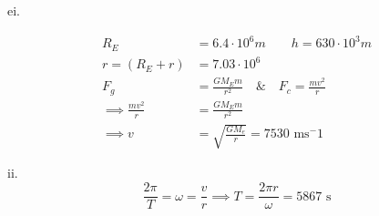 \documentclass[12pt]{article}
\begin{document}
    ei.

    \begin{equation*}
        \begin{split}
            R_E&=6.4\cdot10^6m\qquad h=630\cdot10^3m\\
            r=(R_E+r)&=7.03\cdot10^6\\
            F_g&=\frac{GM_Em}{r^2}\quad\&\quad F_c=\frac{mv^2}{r}\\
            \implies\frac{mv^2}{r}&=\frac{GM_Em}{r^2}\\
            \implies v&=\sqrt{\frac{GM_e}{r}}=7530\text{ ms$^-1$}
        \end{split}
    \end{equation*}

    ii.
    \begin{equation*}
        \frac{2\pi}{T}=\omega=\frac{v}{r}\implies T=\frac{2\pi r}{\omega}=5867\text{ s}
    \end{equation*}
\end{document}
